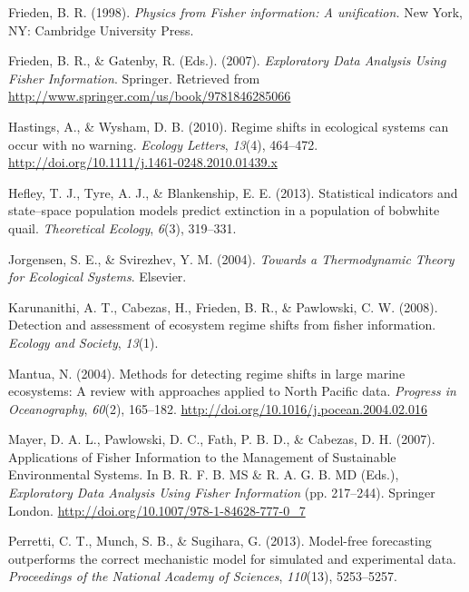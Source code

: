 \documentclass[12pt,twoside]{reedthesis}
\begin{document}
\hypertarget{ref-frieden_physics_1998}{}
Frieden, B. R. (1998). \emph{Physics from Fisher information: A
unification.} New York, NY: Cambridge University Press.

\hypertarget{ref-frieden_exploratory_2007}{}
Frieden, B. R., \& Gatenby, R. (Eds.). (2007). \emph{Exploratory Data
Analysis Using Fisher Information}. Springer. Retrieved from
\url{http://www.springer.com/us/book/9781846285066}

\hypertarget{ref-hastings_regime_2010}{}
Hastings, A., \& Wysham, D. B. (2010). Regime shifts in ecological
systems can occur with no warning. \emph{Ecology Letters}, \emph{13}(4),
464--472. \url{http://doi.org/10.1111/j.1461-0248.2010.01439.x}

\hypertarget{ref-hefley2013statistical}{}
Hefley, T. J., Tyre, A. J., \& Blankenship, E. E. (2013). Statistical
indicators and state--space population models predict extinction in a
population of bobwhite quail. \emph{Theoretical Ecology}, \emph{6}(3),
319--331.

\hypertarget{ref-jorgensen_towards_2004}{}
Jorgensen, S. E., \& Svirezhev, Y. M. (2004). \emph{Towards a
Thermodynamic Theory for Ecological Systems}. Elsevier.

\hypertarget{ref-karunanithi_detection_2008}{}
Karunanithi, A. T., Cabezas, H., Frieden, B. R., \& Pawlowski, C. W.
(2008). Detection and assessment of ecosystem regime shifts from fisher
information. \emph{Ecology and Society}, \emph{13}(1).

\hypertarget{ref-mantua_methods_2004}{}
Mantua, N. (2004). Methods for detecting regime shifts in large marine
ecosystems: A review with approaches applied to North Pacific data.
\emph{Progress in Oceanography}, \emph{60}(2), 165--182.
\url{http://doi.org/10.1016/j.pocean.2004.02.016}

\hypertarget{ref-mayer_applications_2007}{}
Mayer, D. A. L., Pawlowski, D. C., Fath, P. B. D., \& Cabezas, D. H.
(2007). Applications of Fisher Information to the Management of
Sustainable Environmental Systems. In B. R. F. B. MS \& R. A. G. B. MD
(Eds.), \emph{Exploratory Data Analysis Using Fisher Information} (pp.
217--244). Springer London.
\url{http://doi.org/10.1007/978-1-84628-777-0_7}

\hypertarget{ref-perretti_model-free_2013}{}
Perretti, C. T., Munch, S. B., \& Sugihara, G. (2013). Model-free
forecasting outperforms the correct mechanistic model for simulated and
experimental data. \emph{Proceedings of the National Academy of
Sciences}, \emph{110}(13), 5253--5257.
\end{document}
